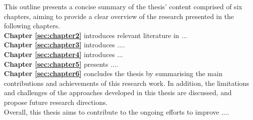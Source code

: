This outline presents a concise summary of the thesis' content comprised of six chapters, aiming to provide a clear overview of the research presented in the following chapters.\\


\noindent\textbf{Chapter \ref{sec:chapter2}} introduces relevant literature in ...\\

\noindent\textbf{Chapter \ref{sec:chapter3}}  introduces ....\\

\noindent\textbf{Chapter \ref{sec:chapter4}} introduces ...\\

\noindent\textbf{Chapter \ref{sec:chapter5}} presents .... \\

\noindent\textbf{Chapter \ref{sec:chapter6}} concludes the thesis by summarising the main contributions and achievements of this research work. In addition, the limitations and challenges of the approaches developed in this thesis are discussed, and propose future research directions.\\ 

\noindent Overall, this thesis aims to contribute to the ongoing efforts to improve ....